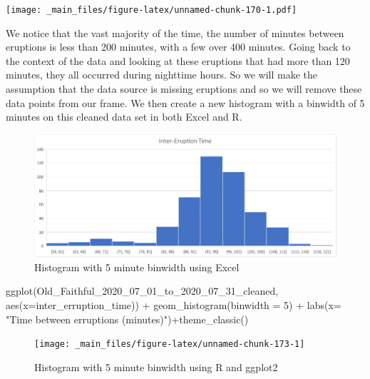 \documentclass[
]{book}
\newenvironment{Shaded}{\begin{snugshade}}{\end{snugshade}}
\newcommand{\AttributeTok}[1]{\textcolor[rgb]{0.77,0.63,0.00}{#1}}
\newcommand{\DecValTok}[1]{\textcolor[rgb]{0.00,0.00,0.81}{#1}}
\newcommand{\FunctionTok}[1]{\textcolor[rgb]{0.00,0.00,0.00}{#1}}
\newcommand{\NormalTok}[1]{#1}
\newcommand{\SpecialCharTok}[1]{\textcolor[rgb]{0.00,0.00,0.00}{#1}}
\newcommand{\StringTok}[1]{\textcolor[rgb]{0.31,0.60,0.02}{#1}}
\theoremstyle{definition}
\theoremstyle{definition}
\theoremstyle{definition}
\theoremstyle{definition}
\theoremstyle{remark}
\begin{document}
\texttt{[image: \_main\_files/figure-latex/unnamed-chunk-170-1.pdf]}

We notice that the vast majority of the time, the number of minutes between eruptions is less than 200 minutes, with a few over 400 minutes. Going back to the context of the data and looking at these eruptions that had more than 120 minutes, they all occurred during nighttime hours. So we will make the assumption that the data source is missing eruptions and so we will remove these data points from our frame. We then create a new histogram with a binwidth of 5 minutes on this cleaned data set in both Excel and R.

\begin{figure}

{\centering \includegraphics[width=0.9\linewidth]{data-examples/Old-Faithful/Eruption_Hist2_Excel} 

}

\caption{Histogram with 5 minute binwidth using Excel}\label{fig:unnamed-chunk-171}
\end{figure}

\begin{Shaded}
\begin{Highlighting}[]
\FunctionTok{ggplot}\NormalTok{(Old\_Faithful\_2020\_07\_01\_to\_2020\_07\_31\_cleaned, }\FunctionTok{aes}\NormalTok{(}\AttributeTok{x=}\NormalTok{inter\_erruption\_time)) }\SpecialCharTok{+} \FunctionTok{geom\_histogram}\NormalTok{(}\AttributeTok{binwidth =} \DecValTok{5}\NormalTok{) }\SpecialCharTok{+} \FunctionTok{labs}\NormalTok{(}\AttributeTok{x=} \StringTok{"Time between erruptions (minutes)"}\NormalTok{)}\SpecialCharTok{+}\FunctionTok{theme\_classic}\NormalTok{()}
\end{Highlighting}
\end{Shaded}

\begin{figure}

{\centering \texttt{[image: \_main\_files/figure-latex/unnamed-chunk-173-1]} 

}

\caption{Histogram with 5 minute binwidth using R and ggplot2}\label{fig:unnamed-chunk-173}
\end{figure}
\end{document}
